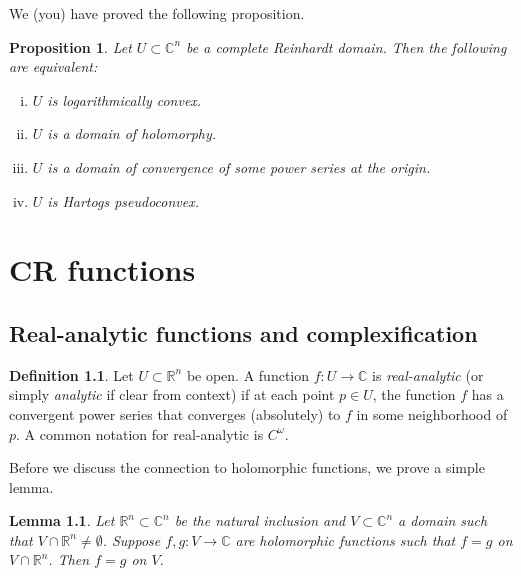 \documentclass[12pt,openany]{book}
\newcommand{\C}{{\mathbb{C}}}
\newcommand{\R}{{\mathbb{R}}}
\newcommand{\myindex}[1]{#1\index{#1}}
\theoremstyle{plain}
\newtheorem{lemma}[thm]{Lemma}
\newtheorem{prop}[thm]{Proposition}
\theoremstyle{remark}
\theoremstyle{definition}
\newtheorem{defn}[thm]{Definition}
\theoremstyle{exercise}
\theoremstyle{example}
\begin{document}
\pagebreak[2]
We (you) have proved the following proposition.

\begin{prop}
\pagebreak[2]
Let $U \subset \C^n$ be a complete Reinhardt domain.  Then the following are
equivalent:
\begin{enumerate}[(i)]
\item
$U$ is logarithmically convex.
\item
$U$ is a domain of holomorphy.
\item
$U$ is a domain of convergence of some power series at the origin.
\item
$U$ is Hartogs pseudoconvex.
\end{enumerate}
\end{prop}


\chapter{CR functions} \label{ch:crfunctions}


\section{Real-analytic functions and complexification}

\begin{defn}
Let $U \subset \R^n$ be open.
A function $f \colon U \to \C$ is 
\emph{\myindex{real-analytic}} (or simply \emph{analytic} if
clear from context) if at each point $p \in U$, the function $f$
has a convergent power series that converges (absolutely) to $f$ in some
neighborhood of $p$.
%
A common notation for real-analytic is $C^\omega$.
\end{defn}

Before we discuss the connection to holomorphic functions, we prove a simple
lemma.

\begin{lemma} \label{lemma:sameonRn}
Let $\R^n \subset \C^n$ be the natural inclusion and 
$V \subset \C^n$ a domain such that $V \cap \R^n \not= \emptyset$.
Suppose $f,g \colon V \to \C$ are holomorphic functions such that
$f=g$ on $V \cap \R^n$.  Then $f=g$ on $V$.
\end{lemma}
\end{document}
